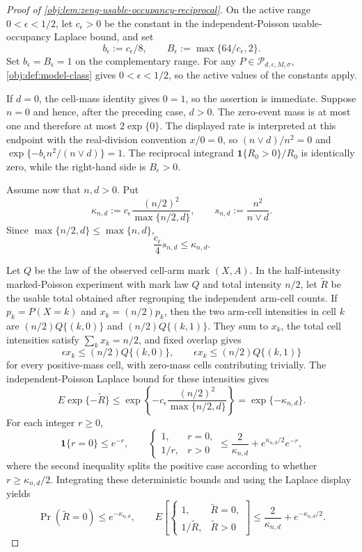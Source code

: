 \documentclass[11pt]{article}
\begin{document}
\begin{proof}[Proof of \cref{obj:lem:zeng-usable-occupancy-reciprocal}]
On the active range \(0<\epsilon<1/2\), let \(c_\epsilon>0\) be the constant in the independent-Poisson usable-occupancy Laplace bound, and set
\[
b_\epsilon:=c_\epsilon/8,\qquad B_\epsilon:=\max\{64/c_\epsilon,2\}.
\]
Set \(b_\epsilon=B_\epsilon=1\) on the complementary range.  For any \(P\in\mathcal P_{d,\epsilon,M,\sigma}\), \cref{obj:def:model-class} gives \(0<\epsilon<1/2\), so the active values of the constants apply. %

If \(d=0\), the cell-mass identity gives \(0=1\), so the assertion is immediate.  Suppose \(n=0\) and hence, after the preceding case, \(d>0\).  The zero-event mass is at most one and therefore at most \(2\exp\{0\}\).  The displayed rate is interpreted at this endpoint with the real-division convention \(x/0=0\), so \((n\vee d)/n^2=0\) and \(\exp\{-b_\epsilon n^2/(n\vee d)\}=1\).  The reciprocal integrand \(\mathbf 1\{R_0>0\}/R_0\) is identically zero, while the right-hand side is \(B_\epsilon>0\). %

Assume now that \(n,d>0\).  Put
\[
\kappa_{n,d}:=c_\epsilon\frac{(n/2)^2}{\max\{n/2,d\}},\qquad
s_{n,d}:=\frac{n^2}{n\vee d}.
\]
Since \(\max\{n/2,d\}\le \max\{n,d\}\),
\[
\frac{c_\epsilon}{4}s_{n,d}\le \kappa_{n,d}.
\]

Let \(Q\) be the law of the observed cell-arm mark \((X,A)\).  In the half-intensity marked-Poisson experiment with mark law \(Q\) and total intensity \(n/2\), let \(\widetilde R\) be the usable total obtained after regrouping the independent arm-cell counts.  If \(p_k=P(X=k)\) and \(x_k=(n/2)p_k\), then the two arm-cell intensities in cell \(k\) are \((n/2)Q\{(k,0)\}\) and \((n/2)Q\{(k,1)\}\).  They sum to \(x_k\), the total cell intensities satisfy \(\sum_k x_k=n/2\), and fixed overlap gives
\[
\epsilon x_k\le (n/2)Q\{(k,0)\},\qquad
\epsilon x_k\le (n/2)Q\{(k,1)\}
\]
for every positive-mass cell, with zero-mass cells contributing trivially.  The independent-Poisson Laplace bound for these intensities gives
\[
E\exp\{-\widetilde R\}
\le
\exp\left\{-c_\epsilon\frac{(n/2)^2}{\max\{n/2,d\}}\right\}
=\exp\{-\kappa_{n,d}\}.
\]
For each integer \(r\ge0\),
\[
\mathbf 1\{r=0\}\le e^{-r},\qquad
\begin{cases}
1,& r=0,\\
1/r,& r>0
\end{cases}
\le \frac{2}{\kappa_{n,d}}+e^{\kappa_{n,d}/2}e^{-r},
\]
where the second inequality splits the positive case according to whether \(r\ge \kappa_{n,d}/2\).  Integrating these deterministic bounds and using the Laplace display yields
\[
\Pr(\widetilde R=0)\le e^{-\kappa_{n,d}},\qquad
E\left[\begin{cases}
1,& \widetilde R=0,\\
1/\widetilde R,& \widetilde R>0
\end{cases}\right]
\le \frac{2}{\kappa_{n,d}}+e^{-\kappa_{n,d}/2}.
\]


\end{proof}
\end{document}
